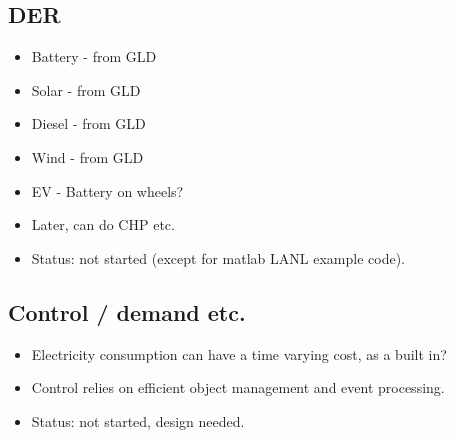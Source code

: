 \documentclass[12pt]{article}
\newcommand{\itm}[1]{\begin{itemize}#1\end{itemize}}
\begin{document}
\subsection{DER}
\itm{
	\item Battery - from GLD
	\item Solar - from GLD
	\item Diesel - from GLD
	\item Wind - from GLD
	\item EV - Battery on wheels?
	\item Later, can do CHP etc.
	\item Status: not started (except for matlab LANL example code).
}

\subsection{Control / demand etc.}
\itm{
	\item Electricity consumption can have a time varying cost, as a built in?
	\item Control relies on efficient object management and event processing.
	\item Status: not started, design needed.
}
\newpage
\end{document}
